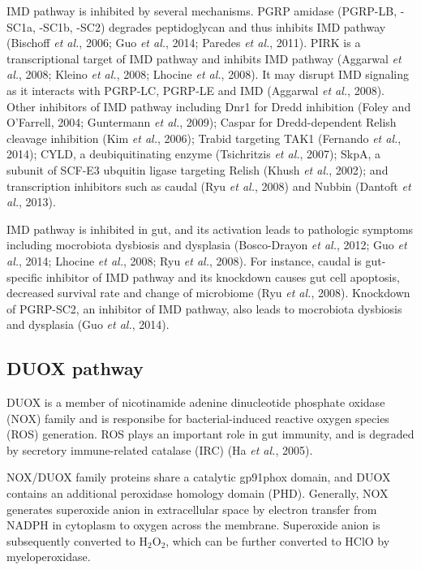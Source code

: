 \documentclass[11pt]{article}
\begin{document}
IMD pathway is inhibited by several mechanisms. 
PGRP amidase (PGRP-LB, -SC1a, -SC1b, -SC2) degrades peptidoglycan and thus inhibits IMD pathway (Bischoff \textit{et al.}, 2006; Guo \textit{et al.}, 2014; Paredes \textit{et al.}, 2011). 
PIRK is a transcriptional target of IMD pathway and inhibits IMD pathway (Aggarwal \textit{et al.}, 2008; Kleino \textit{et al.}, 2008; Lhocine \textit{et al.}, 2008). 
It may disrupt IMD signaling as it interacts with PGRP-LC, PGRP-LE and IMD (Aggarwal \textit{et al.}, 2008). 
Other inhibitors of IMD pathway including 
Dnr1 for Dredd inhibition (Foley and O'Farrell, 2004; Guntermann \textit{et al.}, 2009); 
Caspar for Dredd-dependent Relish cleavage inhibition (Kim \textit{et al.}, 2006); 
Trabid targeting TAK1 (Fernando \textit{et al.}, 2014); 
CYLD, a deubiquitinating enzyme (Tsichritzis \textit{et al.}, 2007); 
SkpA, a subunit of SCF-E3 ubquitin ligase targeting Relish (Khush \textit{et al.}, 2002); 
and transcription inhibitors such as caudal (Ryu \textit{et al.}, 2008) and Nubbin (Dantoft \textit{et al.}, 2013).

\newline

IMD pathway is inhibited in gut, and its activation leads to pathologic symptoms including mocrobiota dysbiosis and dysplasia (Bosco-Drayon \textit{et al.}, 2012; Guo \textit{et al.}, 2014; Lhocine \textit{et al.}, 2008; Ryu \textit{et al.}, 2008). 
For instance, caudal is gut-specific inhibitor of IMD pathway and its knockdown causes gut cell apoptosis, decreased survival rate and change of microbiome (Ryu \textit{et al.}, 2008). 
Knockdown of PGRP-SC2, an inhibitor of IMD pathway, also leads to mocrobiota dysbiosis and dysplasia (Guo \textit{et al.}, 2014). 

\subsection{DUOX pathway}
DUOX is a member of nicotinamide adenine dinucleotide phosphate oxidase (NOX) family and is responsibe for bacterial-induced reactive oxygen species (ROS) generation. 
ROS plays an important role in gut immunity, and is degraded by secretory immune-related catalase (IRC) (Ha \textit{et al.}, 2005).

\newline

NOX/DUOX family proteins share a catalytic gp91phox domain, and DUOX contains an additional peroxidase homology domain (PHD). 
Generally, NOX generates superoxide anion in extracellular space by electron transfer from NADPH in cytoplasm to oxygen across the membrane. 
Superoxide anion is subsequently converted to H$_2$O$_2$, which can be further converted to HClO by myeloperoxidase. 
\end{document}
